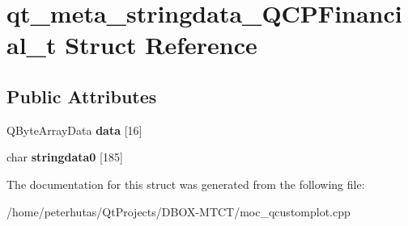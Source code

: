 \hypertarget{structqt__meta__stringdata___q_c_p_financial__t}{}\section{qt\+\_\+meta\+\_\+stringdata\+\_\+\+Q\+C\+P\+Financial\+\_\+t Struct Reference}
\label{structqt__meta__stringdata___q_c_p_financial__t}
\subsection*{Public Attributes}
\begin{DoxyCompactItemize}
\item 
\mbox{\label{structqt__meta__stringdata___q_c_p_financial__t_a32be9c8341c33d8c6da741702c103986}} 
Q\+Byte\+Array\+Data {\bfseries data} \mbox{[}16\mbox{]}
\item 
\mbox{\label{structqt__meta__stringdata___q_c_p_financial__t_ad8ba9429514fbfd381c387ad7d4fd8c5}} 
char {\bfseries stringdata0} \mbox{[}185\mbox{]}
\end{DoxyCompactItemize}


The documentation for this struct was generated from the following file\+:\begin{DoxyCompactItemize}
\item 
/home/peterhutas/\+Qt\+Projects/\+D\+B\+O\+X-\/\+M\+T\+C\+T/moc\+\_\+qcustomplot.\+cpp\end{DoxyCompactItemize}
